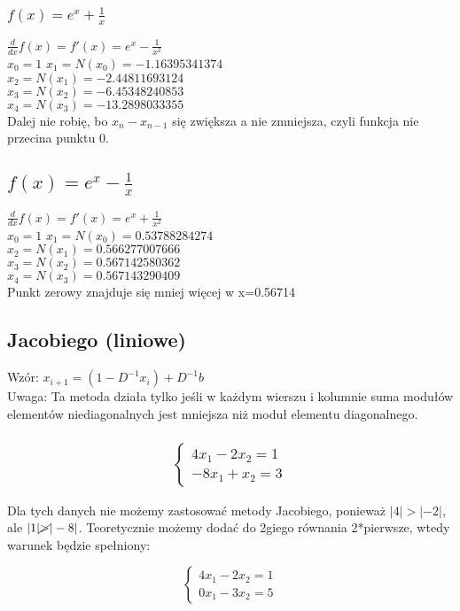 \documentclass{article}
\begin{document}
\subsubsection{$f(x)=e^x+\frac{1}{x}$}
$\frac{d}{dx}f(x)=f'(x)=e^x-\frac{1}{x^2}$\\
$x_0=1$
$x_1=N(x_0)=-1.16395341374$\\
$x_2=N(x_1)=-2.44811693124$\\
$x_3=N(x_2)=-6.45348240853$\\
$x_4=N(x_3)=-13.2898033355$\\

Dalej nie robię, bo $x_n-x_{n-1}$ się zwiększa a nie zmniejsza, czyli funkcja nie przecina punktu 0.

\subsection{$f(x)=e^x-\frac{1}{x}$}
$\frac{d}{dx}f(x)=f'(x)=e^x+\frac{1}{x^2}$\\
$x_0=1$
$x_1=N(x_0)=0.53788284274$\\
$x_2=N(x_1)=0.566277007666$\\
$x_3=N(x_2)=0.567142580362$\\
$x_4=N(x_3)=0.567143290409$\\

Punkt zerowy znajduje się mniej więcej w x=0.56714

\subsection{Jacobiego (liniowe)}
Wzór: $x_{i+1}=(1-D^{-1}x_i)+D^{-1}b$\\
Uwaga: Ta metoda działa tylko jeśli w każdym wierszu i kolumnie suma modułów elementów niediagonalnych jest mniejsza niż moduł elementu diagonalnego.
\subsubsection{\begin{equation*}\begin{cases}
    4x_1-2x_2=1\\
    -8x_1+x_2=3
\end{cases}\end{equation*}}
Dla tych danych nie możemy zastosować metody Jacobiego, ponieważ $|4|>|-2|$, ale $|1|\cancel{>}|-8|$. Teoretycznie możemy dodać do 2giego równania 2*pierwsze, wtedy warunek będzie spełniony:

\begin{equation*}\begin{cases}
    4x_1-2x_2=1\\
    0x_1-3x_2=5
\end{cases}\end{equation*}
\end{document}
